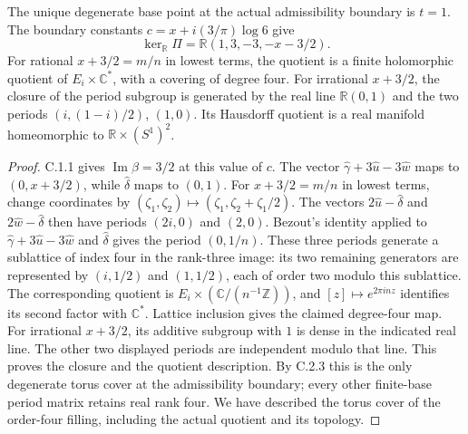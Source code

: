 \begin{proposition}\label{fam:src:C.3.2}\label{fam:st:C.3.2}
The unique degenerate base point at the actual admissibility boundary is
\(t=1\). The boundary constants
\(c=x+i(3/\pi)\log6\) give
\[
 \ker_{\mathbb R}\Pi=\mathbb R(1,3,-3,-x-3/2).
\]
For rational $x+3/2=m/n$ in lowest terms, the quotient is a
finite holomorphic quotient of $E_i\times\mathbb C^*$, with a covering
of degree four. For irrational \(x+3/2\), the closure of the period subgroup is generated
by the real line \(\mathbb R(0,1)\) and the two periods
\((i,(1-i)/2)\), \((1,0)\). Its Hausdorff quotient is a real manifold
homeomorphic to \(\mathbb R\times(S^1)^2\).
\end{proposition}
\begin{proof}
C.1.1 gives \(\operatorname{Im}\beta=3/2\) at this value of \(c\).
The vector \(\widehat\gamma+3\widehat u-3\widehat w\) maps to
\((0,x+3/2)\), while \(\widehat\delta\) maps to \((0,1)\).
For $x+3/2=m/n$ in lowest terms, change coordinates by
$(\zeta_1,\zeta_2)\mapsto(\zeta_1,\zeta_2+\zeta_1/2)$.
The vectors $2\widehat u-\widehat\delta$ and
$2\widehat w-\widehat\delta$ then have periods $(2i,0)$ and $(2,0)$.
Bezout's identity applied to $\widehat\gamma+3\widehat u-3\widehat w$
and $\widehat\delta$ gives the period $(0,1/n)$.
These three periods generate a sublattice of index four in the rank-three
image: its two remaining generators are represented by
$(i,1/2)$ and $(1,1/2)$, each of order two modulo this sublattice.
The corresponding quotient is $E_i\times(\mathbb C/(n^{-1}\mathbb Z))$,
and $[z]\mapsto e^{2\pi inz}$ identifies its second factor with
$\mathbb C^*$. Lattice inclusion gives the claimed degree-four map.
For irrational $x+3/2$, its additive subgroup with $1$ is dense in the
indicated real line. The other two displayed periods are independent
modulo that line. This proves the closure and the quotient description.
By C.2.3 this is the only degenerate torus cover at the admissibility
boundary; every other finite-base period matrix retains real rank four.
We have described the torus cover of the order-four filling, including
the actual quotient and its topology.
\end{proof}

